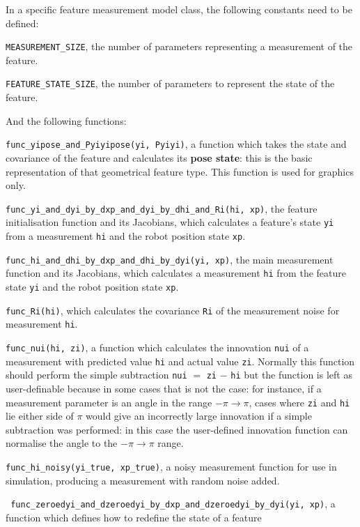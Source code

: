 \documentclass{article}
\begin{document}
In a specific feature measurement model class, the following constants need to
be defined:
\be
\item {\tt MEASUREMENT\_SIZE}, the number of parameters representing a
measurement of the feature.
\item {\tt FEATURE\_STATE\_SIZE}, the number of parameters to
represent the state of the feature.
\ee

And the following functions:

\be

\item {\tt func\_yipose\_and\_Pyiyipose(yi, Pyiyi)}, a function which
takes the state and covariance of the feature and calculates its {\bf
pose state}: this is the basic representation of that geometrical
feature type. This function is used for graphics only.
\item {\tt func\_yi\_and\_dyi\_by\_dxp\_and\_dyi\_by\_dhi\_and\_Ri(hi,
xp)}, the feature initialisation function and its Jacobians, which
calculates a feature's state {\tt yi} from a measurement {\tt hi}
and the robot position state {\tt xp}.
\item {\tt func\_hi\_and\_dhi\_by\_dxp\_and\_dhi\_by\_dyi(yi, xp)},
the main measurement function and its Jacobians, which calculates a
measurement {\tt hi} from the feature state {\tt yi} and the robot
position state {\tt xp}.
\item {\tt func\_Ri(hi)}, which calculates the covariance {\tt Ri} of
the measurement noise for measurement {\tt hi}.
\item {\tt func\_nui(hi, zi)}, a function which calculates the
innovation {\tt nui} of a measurement with predicted value {\tt hi}
and actual value {\tt zi}. Normally this function should  perform the
simple subtraction {\tt nui} $=$ {\tt zi} $-$ {\tt hi} but the
function is left as user-definable because in some cases that is not
the case: for instance, if a measurement parameter is an angle in the
range $-\pi \rightarrow \pi$, cases where {\tt zi} and {\tt hi} lie
either side of $\pi$ would give an incorrectly large innovation if a
simple subtraction was performed: in this case the user-defined
innovation function can normalise the angle to the $-\pi \rightarrow
\pi$ range.
\item {\tt func\_hi\_noisy(yi\_true, xp\_true)}, a noisy measurement
function for use in simulation, producing a measurement with random
noise added.
\item {\tt
func\_zeroedyi\_and\_dzeroedyi\_by\_dxp\_and\_dzeroedyi\_by\_dyi(yi,
xp)}, a function which defines how to redefine the state of a feature
\end{document}
